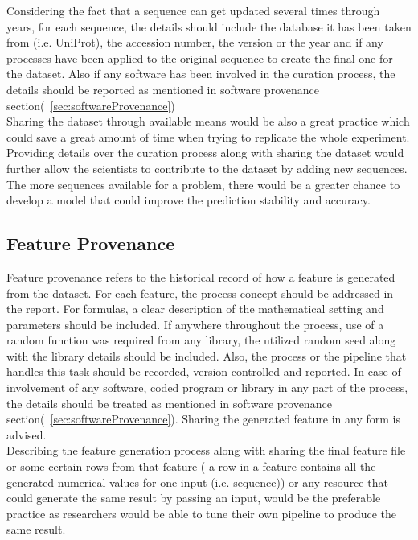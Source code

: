     Considering the fact that a sequence can get updated several times through years, for each sequence, the details should include 
    the database it has been taken from (i.e. UniProt), the accession number, the version or the year and if any 
    processes have been applied to the original sequence to create the final one for the dataset. Also if any software has been 
    involved in the curation process, the details should be reported as mentioned in 
    software provenance section(~\ref{sec:softwareProvenance})\\

    Sharing the dataset through available means would be also a great practice which could save a great amount of time when
    trying to replicate the whole experiment.
    Providing details over the curation process along with sharing the dataset would further allow the scientists to contribute to the 
    dataset by adding new sequences. The more sequences available for a problem, there would be a greater chance to develop a model 
    that could improve the prediction stability and accuracy.

    \subsection{Feature Provenance}

    Feature provenance refers to the historical record of how a feature is generated from the dataset. For each feature, the process concept 
    should be addressed in the report. For formulas, a clear description of the mathematical setting and parameters should be included. If 
    anywhere throughout the process, use of a random function was required from any library, the utilized random seed along with the library 
    details should be included. Also, the process or the pipeline that handles this task should be recorded, version-controlled and reported.
    In case of involvement of any software, coded program or library in any part of the process, the details should be treated 
    as mentioned in software provenance section(~\ref{sec:softwareProvenance}). Sharing the generated feature in any form is advised.\\

    Describing the feature generation process along with sharing the final feature file or some certain rows from that feature ( a row 
    in a feature contains all the generated numerical values for one input (i.e. sequence)) or any resource that could generate the same 
    result by passing an input, would be the preferable practice as researchers would be able to tune their own pipeline to produce the same 
    result. \\
    
